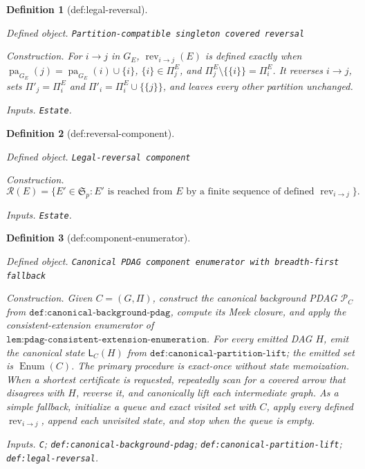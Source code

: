 \documentclass{article}
\newtheorem{definition}{Definition}
\begin{document}
\begin{definition}[def:legal-reversal]\label{def:legal-reversal}
\par\smallskip\noindent\emph{Defined object.} \texttt{Partition-\allowbreak{}compatible singleton covered reversal}
\par\smallskip\noindent\emph{Construction.} For \(i\to j\) in \(G_E\), \(\operatorname{rev}_{i\to j}(E)\) is defined exactly when \(\operatorname{pa}_{G_E}(j)=\operatorname{pa}_{G_E}(i)\cup\{i\}\), \(\{i\}\in\Pi^E_j\), and \(\Pi^E_j\setminus\{\{i\}\}=\Pi^E_i\). It reverses \(i\to j\), sets \(\Pi'_j=\Pi^E_i\) and \(\Pi'_i=\Pi^E_i\cup\{\{j\}\}\), and leaves every other partition unchanged.
\par\smallskip\noindent\emph{Inputs.} \texttt{Estate}.
\end{definition}

\begin{definition}[def:reversal-component]\label{def:reversal-component}
\par\smallskip\noindent\emph{Defined object.} \texttt{Legal-\allowbreak{}reversal component}
\par\smallskip\noindent\emph{Construction.} \[\mathcal R(E)=\{E'\in\mathfrak S_p:E'\text{ is reached from }E\text{ by a finite sequence of defined }\operatorname{rev}_{i\to j}\}.\]
\par\smallskip\noindent\emph{Inputs.} \texttt{Estate}.
\end{definition}

\begin{definition}[def:component-enumerator]\label{def:component-enumerator}
\par\smallskip\noindent\emph{Defined object.} \texttt{Canonical PDAG component enumerator with breadth-\allowbreak{}first fallback}
\par\smallskip\noindent\emph{Construction.} Given \(C=(G,\Pi)\), construct the canonical background PDAG \(\mathcal P_C\) from \(\texttt{def:canonical-background-pdag}\), compute its Meek closure, and apply the consistent-extension enumerator of \(\texttt{lem:pdag-consistent-extension-enumeration}\). For every emitted DAG \(H\), emit the canonical state \(\mathsf L_C(H)\) from \(\texttt{def:canonical-partition-lift}\); the emitted set is \(\operatorname{Enum}(C)\). The primary procedure is exact-once without state memoization. When a shortest certificate is requested, repeatedly scan for a covered arrow that disagrees with \(H\), reverse it, and canonically lift each intermediate graph. As a simple fallback, initialize a queue and exact visited set with \(C\), apply every defined \(\operatorname{rev}_{i\to j}\), append each unvisited state, and stop when the queue is empty.
\par\smallskip\noindent\emph{Inputs.} \texttt{C}; \texttt{def:\allowbreak{}canonical-\allowbreak{}background-\allowbreak{}pdag}; \texttt{def:\allowbreak{}canonical-\allowbreak{}partition-\allowbreak{}lift}; \texttt{def:\allowbreak{}legal-\allowbreak{}reversal}.
\end{definition}
\end{document}
